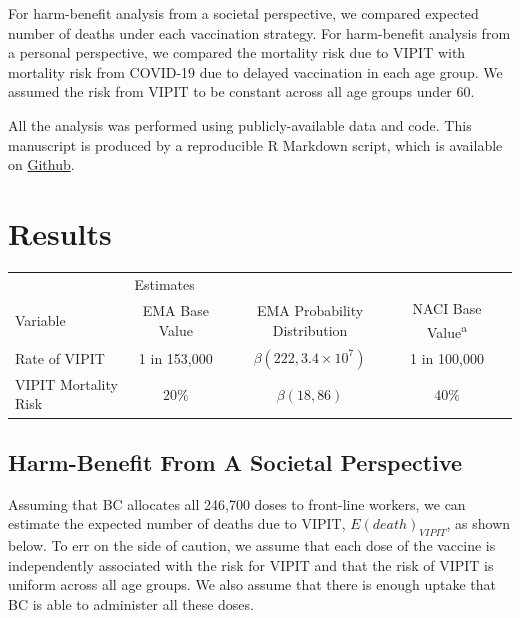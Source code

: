 \documentclass[]{interact}
\theoremstyle{plain}%
\theoremstyle{definition}
\theoremstyle{remark}
\begin{document}
For harm-benefit analysis from a societal perspective, we compared
expected number of deaths under each vaccination strategy. For
harm-benefit analysis from a personal perspective, we compared the
mortality risk due to VIPIT with mortality risk from COVID-19 due to
delayed vaccination in each age group. We assumed the risk from VIPIT to
be constant across all age groups under 60.

All the analysis was performed using publicly-available data and code.
This manuscript is produced by a reproducible R Markdown script, which
is available on
\href{https://github.com/aminadibi/astrazenecaVIPIT}{Github}.

\hypertarget{results}{%
\section{Results}\label{results}}

\begin{table}
{\begin{tabular}{lcccc} \toprule
 & \multicolumn{2}{l}{Estimates} \\ \cmidrule{2-4}
 Variable & EMA Base Value & EMA Probability Distribution & NACI Base Value\textsuperscript{a}  \\ \midrule
 Rate of VIPIT & 1 in 153,000 & $\beta(222, 3.4\times 10^7)$ & 1 in 100,000 \\
 VIPIT Mortality Risk & $20\%$ &  $\beta(18, 86)$ & $40\%$ \\ \bottomrule
\end{tabular}}
\label{sample-table}
\end{table}

\hypertarget{harm-benefit-from-a-societal-perspective}{%
\subsection{Harm-Benefit From A Societal
Perspective}\label{harm-benefit-from-a-societal-perspective}}

Assuming that BC allocates all 246,700 doses to front-line workers, we
can estimate the expected number of deaths due to VIPIT,
\(E(death)_{VIPIT}\), as shown below. To err on the side of caution, we
assume that each dose of the vaccine is independently associated with
the risk for VIPIT and that the risk of VIPIT is uniform across all age
groups. We also assume that there is enough uptake that BC is able to
administer all these doses.
\end{document}
